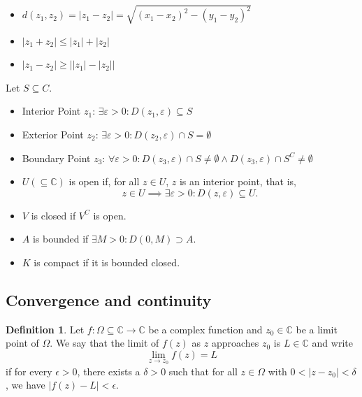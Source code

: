\documentclass[12pt,openany]{book}
\theoremstyle{definition}
\newtheorem{definition}{Definition}[chapter]
\newcommand{\C}{\mathbb{C}}
\newcommand{\abs}[1]{\left\lvert #1 \right\rvert}
\begin{document}
	\begin{itemize}
		\item $d(z_1,z_2)=\abs{z_1-z_2}=\sqrt{(x_1-x_2)^2-(y_1-y_2)^2}$
		\item $\abs{z_1+z_2}\leq\abs{z_1}+\abs{z_2}$
		\item $\abs{z_1-z_2}\geq\abs{\abs{z_1}-\abs{z_2}}$
	\end{itemize}
	Let $S\subseteq C$.
	\begin{itemize}
		\item Interior Point $z_1$: $\exists\varepsilon>0:D(z_1,\varepsilon)\subseteq S$
		\item Exterior Point $z_2$: $\exists\varepsilon>0:D(z_2,\varepsilon)\cap S=\emptyset$
		\item Boundary Point $z_3$: $\forall\varepsilon>0:D(z_3,\varepsilon)\cap S\neq\emptyset\land D(z_3,\varepsilon)\cap S^C\neq\emptyset$
		\item $U(\subseteq\C)$ is open if, for all $z\in U$, $z$ is an interior point, that is, \[
		z\in U\implies\exists\varepsilon>0:D(z,\varepsilon)\subseteq U.
		\]
		\item $V$ is closed if $V^C$ is open.
		\item $A$ is bounded if $\exists M>0:D(0,M)\supset A$.
		\item $K$ is compact if it is bounded closed.
	\end{itemize}
	
	
	
	\iffalse
	\subsection{Convergence and continuity}
	
	\begin{tcolorbox}[colback=white,colframe=defcolor,arc=5pt,title={\color{white}\bf Limit of Complex function}]
		\begin{definition}
			Let $f: \Omega \subseteq \mathbb{C} \rightarrow \mathbb{C}$ be a complex function and $z_0 \in \mathbb{C}$ be a limit point of $\Omega$. We say that the limit of $f(z)$ as $z$ approaches $z_0$ is $L \in \mathbb{C}$ and write
			\[ \lim_{z \to z_0} f(z) = L \]
			if for every $\epsilon > 0$, there exists a $\delta > 0$ such that for all $z \in \Omega$ with $0 < |z - z_0| < \delta$, we have $|f(z) - L| < \epsilon$.
		\end{definition}
	\end{tcolorbox}
	
\end{document}
